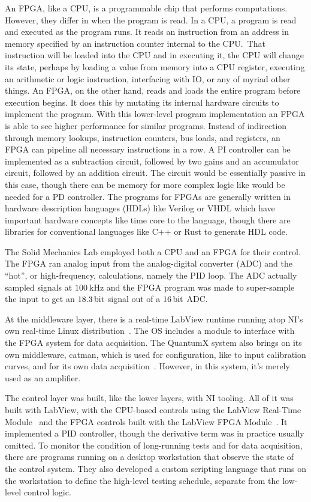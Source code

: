 \documentclass[english,12pt,a4paper,pdftex,eng,utf8]{aaltothesis}
\begin{document}
An FPGA, like a CPU, is a programmable chip that performs computations.  However, they differ in when the program is read.  In a CPU, a program is read and executed as the program runs.  It reads an instruction from an address in memory specified by an instruction counter internal to the CPU.\  That instruction will be loaded into the CPU and in executing it, the CPU will change its state, perhaps by loading a value from memory into a CPU register, executing an arithmetic or logic instruction, interfacing with IO, or any of myriad other things.  An FPGA, on the other hand, reads and loads the entire program before execution begins.  It does this by mutating its internal hardware circuits to implement the program.  With this lower-level program implementation an FPGA is able to see higher performance for similar programs.  Instead of indirection through memory lookups, instruction counters, bus loads, and registers, an FPGA can pipeline all necessary instructions in a row.  A PI controller can be implemented as a subtraction circuit, followed by two gains and an accumulator circuit, followed by an addition circuit.  The circuit would be essentially passive in this case, though there can be memory for more complex logic like would be needed for a PD controller.  The programs for FPGAs are generally written in hardware description languages (HDLs) like Verilog or VHDL which have important hardware concepts like time core to the language, though there are libraries for conventional languages like C++ or Rust to generate HDL code.

The Solid Mechanics Lab employed both a CPU and an FPGA for their control.  The FPGA ran  analog input from the analog-digital converter (ADC) and the ``hot'', or high-frequency, calculations, namely the PID loop.  The ADC actually sampled signals at $\qty{100}{\kilo\hertz}$ and the FPGA program was made to super-sample the input to get an $\qty{18.3}{\bit}$ signal out of a $\qty{16}{\bit}$ ADC.\

At the middleware layer, there is a real-time LabView runtime running atop NI's own real-time Linux distribution~\cite{NICompactRIO}.  The OS includes a module to interface with the FPGA system for data acquisition.  The QuantumX system also brings on its own middleware, catman, which is used for configuration, like to input calibration curves, and for its own data acquisition~\cite{HBKcatman}.  However, in this system, it's merely used as an amplifier.

The control layer was built, like the lower layers, with NI tooling.  All of it was built with LabView, with the CPU-based controls using the LabView Real-Time Module~\cite{NIRealTimeModule} and the FPGA controls built with the LabView FPGA Module~\cite{NIFPGAModule}.  It implemented a PID controller, though the derivative term was in practice usually omitted.  To monitor the condition of long-running tests and for data acquisition, there are programs running on a desktop workstation that observe the state of the control system.  They also developed a custom scripting language that runs on the workstation to define the high-level testing schedule, separate from the low-level control logic.
\end{document}

